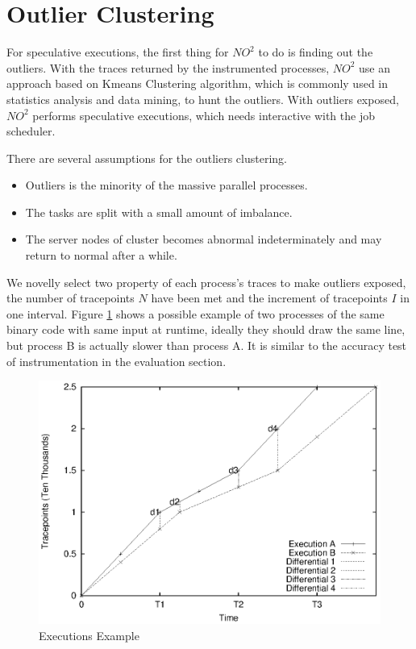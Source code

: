 \section{Outlier Clustering}

For speculative executions, the first thing for $NO^2$ to do is finding out the outliers. With the traces returned by the instrumented processes, $NO^2$ use an approach based on Kmeans Clustering algorithm, which is commonly used in statistics analysis and data mining, to hunt the outliers. With outliers exposed, $NO^2$ performs speculative executions, which needs interactive with the job scheduler.

There are several assumptions for the outliers clustering.

\begin{itemize}
\item Outliers is the minority of the massive parallel processes. 
\item The tasks are split with a small amount of imbalance. 
\item The server nodes of cluster becomes abnormal indeterminately and may return to normal after a while.
\end{itemize}

We novelly select two property of each process's traces to make outliers exposed, the number of tracepoints $N$ have been met and the increment of tracepoints $I$ in one interval. Figure \ref{figure:executionsexample} shows a possible example of two processes of the same binary code with same input at runtime, ideally they should draw the same line, but process B is actually slower than process A. It is similar to the accuracy test of instrumentation in the evaluation section.

\begin{figure}
\centering
\includegraphics[width=0.9\columnwidth]{figures/executions_example.eps}
\caption{Executions Example}
\label{figure:executionsexample}
\end{figure}

